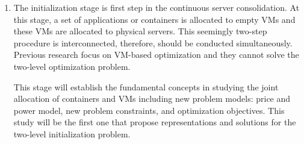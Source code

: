 \begin{enumerate}
\item The initialization stage is first step in the continuous server consolidation.
At this stage, a set of applications or containers is allocated to empty VMs and these VMs are allocated to physical servers. This seemingly two-step procedure is interconnected, therefore, should be conducted simultaneously. Previous research \cite{Jennings:2015ht} focus on VM-based optimization and they cannot solve the two-level optimization problem.  

This stage will establish the fundamental concepts in studying the joint allocation of containers and VMs including new problem models: price and power model, new problem constraints, and optimization objectives. This study will be the first one that propose representations and solutions for the two-level initialization problem.



\end{enumerate}
